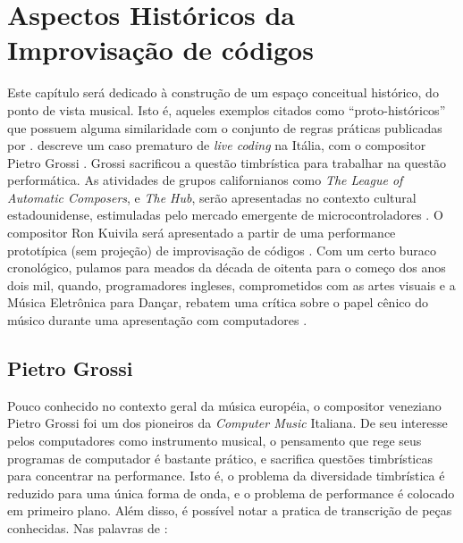 \chapter{Aspectos Históricos da Improvisação de códigos}\label{sec:protohistoria}

Este capítulo será dedicado à construção de um espaço conceitual histórico, do ponto de vista musical. Isto é, aqueles exemplos citados como ``proto-históricos'' que possuem alguma similaridade com o conjunto de regras práticas publicadas por  .  descreve um caso prematuro de \emph{live coding} na Itália, com o compositor Pietro Grossi . Grossi sacrificou a questão timbrística para trabalhar na questão performática. As atividades de grupos californianos como \emph{The League of Automatic Composers}, e \emph{The Hub}, serão apresentadas no contexto cultural estadounidense, estimuladas pelo mercado emergente de microcontroladores . O compositor Ron Kuivila será apresentado a partir de uma performance prototípica (sem projeção) de improvisação de códigos . Com um certo buraco cronológico, pulamos para meados da década de oitenta para o começo dos anos dois mil, quando, programadores ingleses,  comprometidos com as artes visuais e a Música Eletrônica para Dançar, rebatem uma crítica sobre o papel cênico do músico durante uma apresentação com computadores . 


\section{Pietro Grossi}\label{sec:grossi}

Pouco conhecido no contexto geral da música européia, o compositor veneziano Pietro Grossi foi  um dos pioneiros da \emph{Computer Music} Italiana. De seu interesse pelos computadores como instrumento musical, o pensamento que rege seus programas de computador é bastante prático, e sacrifica questões timbrísticas para concentrar na performance. Isto é, o problema da diversidade timbrística é reduzido para uma única forma de onda, e o problema de performance é colocado em primeiro plano. Além disso, é possível notar a pratica de transcrição de peças conhecidas. Nas palavras de :

